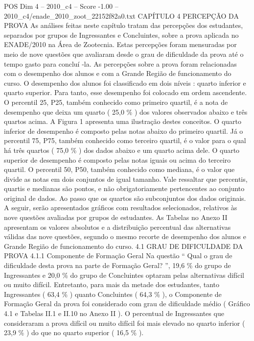 \begin{textsample}{POS Dim 4 – 2010\_c4 – Score -1.00 – 2010\_c4/enade\_2010\_zoot\_22152f82a0.txt}  \label{ex:f4_pos_293}
CAPÍTULO 4 PERCEPÇÃO DA PROVA As análises feitas neste capítulo tratam das percepções dos estudantes, separados por grupos de Ingressantes e Concluintes, sobre a prova aplicada no ENADE/2010 na Área de Zootecnia.
Estas percepções foram mensuradas por meio de nove questões que avaliaram desde o grau de dificuldade da prova até o tempo gasto para concluí -la.
As percepções sobre a prova foram relacionadas com o desempenho dos alunos e com a Grande Região de funcionamento do curso.
O desempenho dos alunos foi classificado em dois níveis : quarto inferior e quarto superior.
Para tanto, esse desempenho foi colocado em ordem ascendente.
O percentil 25, P25, também conhecido como primeiro quartil, é a nota de desempenho que deixa um quarto ( 25,0 \% ) dos valores observados abaixo e três quartos acima.
A Figura 1 apresenta uma ilustração destes conceitos.
O quarto inferior de desempenho é composto pelas notas abaixo do primeiro quartil.
Já o percentil 75, P75, também conhecido como terceiro quartil, é o valor para o qual há três quartos ( 75,0 \% ) dos dados abaixo e um quarto acima dele.
O quarto superior de desempenho é composto pelas notas iguais ou acima do terceiro quartil.
O percentil 50, P50, também conhecido como mediana, é o valor que divide as notas em dois conjuntos de igual tamanho.
Vale ressaltar que percentis, quartis e medianas são pontos, e não obrigatoriamente pertencentes ao conjunto original de dados.
Ao passo que os quartos são subconjuntos dos dados originais.
A seguir, serão apresentados gráficos com resultados selecionados, relativos às nove questões avaliadas por grupos de estudantes.
As Tabelas no Anexo II apresentam os valores absolutos e a distribuição percentual das alternativas válidas das nove questões, segundo o mesmo recorte de desempenho dos alunos e Grande Região de funcionamento do curso. 4.1 GRAU DE DIFICULDADE DA PROVA 4.1.1 Componente de Formação Geral Na questão “ Qual o grau de dificuldade desta prova na parte de Formação Geral? ”, 19,6 \% do grupo de Ingressantes e 20,0 \% do grupo de Concluintes optaram pelas alternativas difícil ou muito difícil.
Entretanto, para mais da metade dos estudantes, tanto Ingressantes ( 63,4 \% ) quanto Concluintes ( 64,3 \% ), o Componente de Formação Geral da prova foi considerado com grau de dificuldade médio ( Gráfico 4.1 e Tabelas II.1 e II.10 no Anexo II ).
O percentual de Ingressantes que consideraram a prova difícil ou muito difícil foi mais elevado no quarto inferior ( 23,9 \% ) do que no quarto superior ( 16,5 \% ).

\end{textsample}
